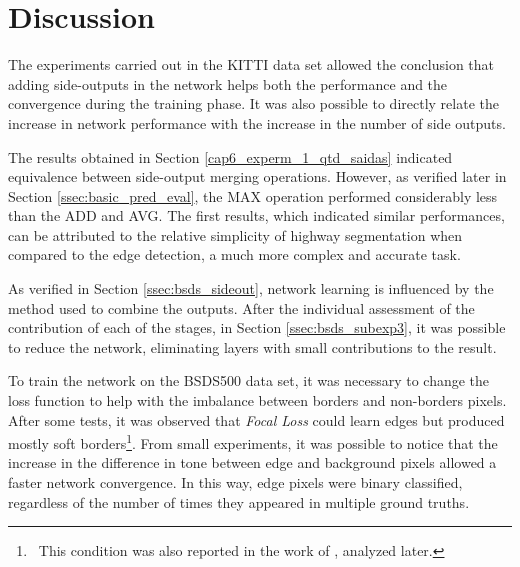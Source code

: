 \section{Discussion}
\label{cap6_discussion}

The experiments carried out in the KITTI data set allowed the conclusion that adding side-outputs in the network helps both the performance and the convergence during the training phase.
It was also possible to directly relate the increase in network performance with the increase in the number of side outputs.

The results obtained in Section \ref{cap6_experm_1_qtd_saidas} indicated equivalence between side-output merging operations.
However, as verified later in Section \ref{ssec:basic_pred_eval}, the MAX operation performed considerably less than the ADD and AVG.
The first results, which indicated similar performances, can be attributed to the relative simplicity of highway segmentation when compared to the edge detection, a much more complex and accurate task.

As verified in Section \ref{ssec:bsds_sideout}, network learning is influenced by the method used to combine the outputs.
After the individual assessment of the contribution of each of the stages, in Section \ref{ssec:bsds_subexp3}, it was possible to reduce the network, eliminating layers with small contributions to the result.

To train the network on the BSDS500 data set, it was necessary to change the loss function to help with the imbalance between borders and non-borders pixels.
After some tests, it was observed that \textit{Focal Loss} could learn edges but produced mostly soft borders\footnote{~This condition was also reported in the work of \cite{WangDOOBNet:2018}, analyzed later.}.
From small experiments, it was possible to notice that the increase in the difference in tone between edge and background pixels allowed a faster network convergence.
In this way, edge pixels were binary classified, regardless of the number of times they appeared in multiple ground truths.


